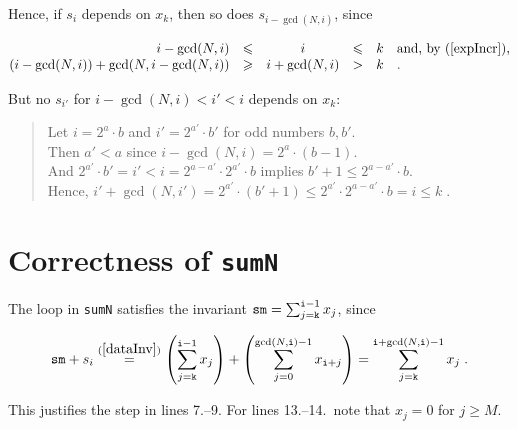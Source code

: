 \documentclass{elsartNoFoot}
\newcommand{\1}{\color{red}}
\newcommand{\2}{\color{green}}
\renewcommand{\leq}{\leqslant}		\renewcommand{\geq}{\geqslant}
\newcommand{\X}[1]{x_{#1}}		\renewcommand{\S}[1]{s_{#1}}
\newcommand{\+}[3]{{\renewcommand{\i}{{#1}}{#3},\ldots,\renewcommand{\i}{{#2}}{#3}}}
\newcommand{\ti}{{\tt i}}		\newcommand{\tk}{{\tt k}}
\renewcommand{\exp}[1]{\gcd(N,#1)}
\newcommand{\rf}[2]{\stackrel{(\ref{#1})}{#2}}
\begin{document}
Hence, if $\S{i}$ depends on $\X{k}$,
then so does $\S{i-\exp{i}}$, since

\begin{eqnarray*}
	\begin{array}{@{}rcccll@{}}
	i - \exp{i} & \leq & i & \leq & k
	& \mbox{and, by (\ref{expIncr}),}	\\
	(i - \exp{i}) + \exp{i - \exp{i}}
	& \geq & 
	i + \exp{i} & > & k & .	\\
	\end{array}
\end{eqnarray*}

But no $\S{i'}$ for $i - \exp{i} < i' < i$ depends on $\X{k}$:
\begin{quote}
Let $i = 2^a \cdot b$ and $i' = 2^{a'} \cdot b'$ 
for odd numbers $b, b'$.
\\
Then $a' < a$ since $i - \exp{i} = 2^a \cdot (b-1)$.
\\
And $2^{a'} \cdot b' = i' < i = 2^{a-a'} \cdot 2^{a'} \cdot b$
implies $b'+1 \leq 2^{a-a'}\cdot b$.
\\
Hence,
$
	i' + \exp{i'} 
	= 2^{a'} \cdot (b'+1) 
	\leq 2^{a'} \cdot 2^{a-a'}\cdot b
	= i
	\leq k \; .
$
\end{quote}






\section{Correctness of {\tt sumN}}
\label{Correctness of sumN}

The loop in {\tt sumN} satisfies the invariant
${\tt sm} = \sum_{j=\tk}^{\ti-1} \X{j}$,
since

\begin{displaymath}
{\tt sm} + \S{i}
\rf{dataInv}= \left( \sum_{j=\tk}^{\ti-1} \X{j} \right)
+ \left( \sum_{j=0}^{\exp{\ti}-1} \X{\ti+j} \right)
= \sum_{j=\tk}^{\ti+\exp{\ti}-1} \X{j} \; .
\end{displaymath}

This justifies the step in lines 7.--9.
For lines 13.--14.\ note that $\X{j} = 0$ for $j \geq M$.
\end{document}

